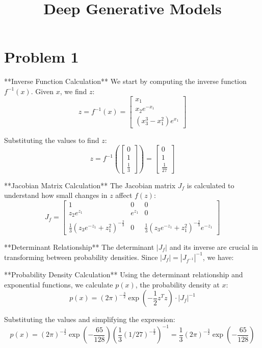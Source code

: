 \documentclass{article}
\title{Deep Generative Models \par \exerciseset}
\author{\SecondAuther}
\begin{document}
\maketitle

\section*{Problem 1}
**Inverse Function Calculation**  
We start by computing the inverse function \( f^{-1}(x) \). Given \( x \), we find \( z \):  
\[
z = f^{-1}(x) = 
\begin{bmatrix} 
x_1 \\ 
x_2 e^{-x_1} \\ 
(x_3^3 - x_1^2)e^{x_1} 
\end{bmatrix}
\]

Substituting the values to find \( z \):  
\[
z = f^{-1}\left( \begin{bmatrix} 0 \\ 1 \\ \frac{1}{3} \end{bmatrix} \right) = \begin{bmatrix} 0 \\ 1 \\ \frac{1}{27} \end{bmatrix}
\]

**Jacobian Matrix Calculation**  
The Jacobian matrix \( J_f \) is calculated to understand how small changes in \( z \) affect \( f(z) \):  
\[
J_f = 
\begin{bmatrix}
1 & 0 & 0 \\
z_2 e^{z_1} & e^{z_1} & 0 \\
\frac{1}{3}\left(z_3 e^{-z_1} + z_1^2\right)^{-\frac{2}{3}} & 0 & \frac{1}{3}\left(z_3 e^{-z_1} + z_1^2\right)^{-\frac{2}{3}} e^{-z_1}
\end{bmatrix}
\]

**Determinant Relationship**  
The determinant \( |J_f| \) and its inverse are crucial in transforming between probability densities.  
Since \( |J_f| = |J_{f^{-1}}|^{-1} \), we have:  

**Probability Density Calculation**  
Using the determinant relationship and exponential functions, we calculate \( p(x) \), the probability density at \( x \):  
\[
p(x) = (2\pi)^{-\frac{3}{2}} \exp\left( -\frac{1}{2} z^T z \right) \cdot |J_f|^{-1}
\]

Substituting the values and simplifying the expression:  
\[
p(x) = (2\pi)^{-\frac{3}{2}} \exp\left( - \frac{65}{128} \right) \left( \frac{1}{3}(1/27)^{-\frac{2}{3}} \right)^{-1}
 = \frac{1}{3}(2\pi)^{-\frac{3}{2}} \exp\left( - \frac{65}{128} \right)
\]
\end{document}
